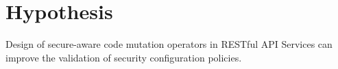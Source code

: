 \section{Hypothesis}

Design of secure-aware code mutation operators in RESTful API Services can improve the validation of security configuration policies.
